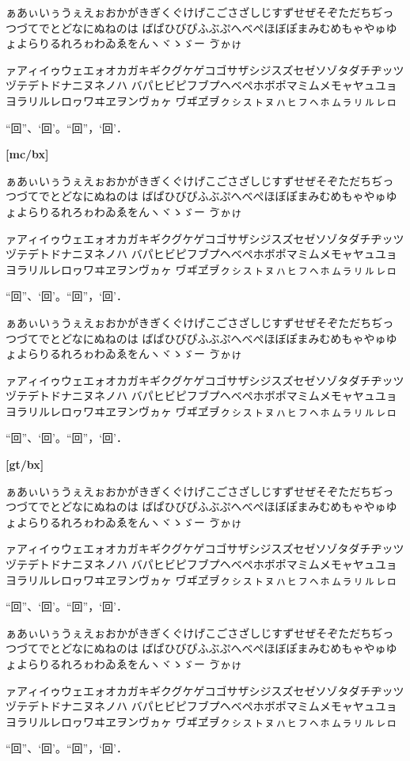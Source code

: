 \documentclass[a4paper,titlepage, draft]{\class}
\begin{document}
\clearpage
[mc/m]

ぁあぃいぅうぇえぉおかがきぎくぐけげこごさざしじすずせぜそぞただちぢっつづてでとどなにぬねのは
ばぱひびぴふぶぷへべぺほぼぽまみむめもゃやゅゆょよらりるれろゎわゐゑをんヽヾゝゞー
\ifuptexmode
ゔゕゖ
\fi

ァアィイゥウェエォオカガキギクグケゲコゴサザシジスズセゼソゾタダチヂッツヅテデトドナニヌネノハ
バパヒビピフブプヘベペホボポマミムメモャヤュユョヨラリルレロヮワヰヱヲンヴヵヶ
\ifuptexmode
ヷヸヹヺㇰㇱㇲㇳㇴㇵㇶㇷㇸㇹㇺㇻㇼㇽㇾㇿ
\fi

“回”、‘回’。“回”，‘回’．

{\bfseries%
[mc/bx]

ぁあぃいぅうぇえぉおかがきぎくぐけげこごさざしじすずせぜそぞただちぢっつづてでとどなにぬねのは
ばぱひびぴふぶぷへべぺほぼぽまみむめもゃやゅゆょよらりるれろゎわゐゑをんヽヾゝゞー
\ifuptexmode
ゔゕゖ
\fi

ァアィイゥウェエォオカガキギクグケゲコゴサザシジスズセゼソゾタダチヂッツヅテデトドナニヌネノハ
バパヒビピフブプヘベペホボポマミムメモャヤュユョヨラリルレロヮワヰヱヲンヴヵヶ
\ifuptexmode
ヷヸヹヺㇰㇱㇲㇳㇴㇵㇶㇷㇸㇹㇺㇻㇼㇽㇾㇿ
\fi

“回”、‘回’。“回”，‘回’．
}

{\gtfamily
[gt/m]

ぁあぃいぅうぇえぉおかがきぎくぐけげこごさざしじすずせぜそぞただちぢっつづてでとどなにぬねのは
ばぱひびぴふぶぷへべぺほぼぽまみむめもゃやゅゆょよらりるれろゎわゐゑをんヽヾゝゞー
\ifuptexmode
ゔゕゖ
\fi

ァアィイゥウェエォオカガキギクグケゲコゴサザシジスズセゼソゾタダチヂッツヅテデトドナニヌネノハ
バパヒビピフブプヘベペホボポマミムメモャヤュユョヨラリルレロヮワヰヱヲンヴヵヶ
\ifuptexmode
ヷヸヹヺㇰㇱㇲㇳㇴㇵㇶㇷㇸㇹㇺㇻㇼㇽㇾㇿ
\fi

“回”、‘回’。“回”，‘回’．

{\bfseries%
[gt/bx]

ぁあぃいぅうぇえぉおかがきぎくぐけげこごさざしじすずせぜそぞただちぢっつづてでとどなにぬねのは
ばぱひびぴふぶぷへべぺほぼぽまみむめもゃやゅゆょよらりるれろゎわゐゑをんヽヾゝゞー
\ifuptexmode
ゔゕゖ
\fi

ァアィイゥウェエォオカガキギクグケゲコゴサザシジスズセゼソゾタダチヂッツヅテデトドナニヌネノハ
バパヒビピフブプヘベペホボポマミムメモャヤュユョヨラリルレロヮワヰヱヲンヴヵヶ
\ifuptexmode
ヷヸヹヺㇰㇱㇲㇳㇴㇵㇶㇷㇸㇹㇺㇻㇼㇽㇾㇿ
\fi

“回”、‘回’。“回”，‘回’．
}}

{\mgfamily
[mg/m]

ぁあぃいぅうぇえぉおかがきぎくぐけげこごさざしじすずせぜそぞただちぢっつづてでとどなにぬねのは
ばぱひびぴふぶぷへべぺほぼぽまみむめもゃやゅゆょよらりるれろゎわゐゑをんヽヾゝゞー
\ifuptexmode
ゔゕゖ
\fi

ァアィイゥウェエォオカガキギクグケゲコゴサザシジスズセゼソゾタダチヂッツヅテデトドナニヌネノハ
バパヒビピフブプヘベペホボポマミムメモャヤュユョヨラリルレロヮワヰヱヲンヴヵヶ
\ifuptexmode
ヷヸヹヺㇰㇱㇲㇳㇴㇵㇶㇷㇸㇹㇺㇻㇼㇽㇾㇿ
\fi

“回”、‘回’。“回”，‘回’．
}
\end{document}
